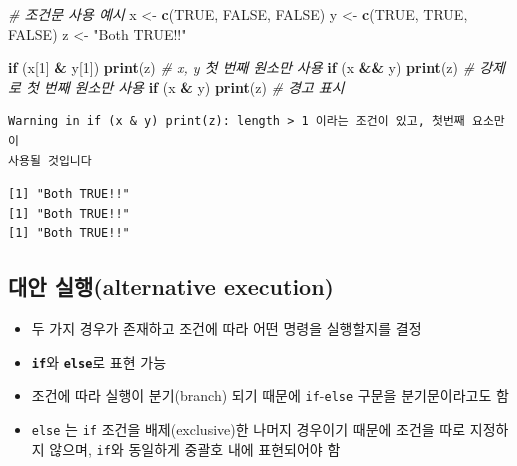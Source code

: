 \documentclass[
  11pt,
]{krantz}
\newenvironment{Shaded}{\begin{snugshade}}{\end{snugshade}}
\newcommand{\CommentTok}[1]{\textcolor[rgb]{0.37,0.37,0.37}{\textit{#1}}}
\newcommand{\ControlFlowTok}[1]{\textcolor[rgb]{0.27,0.27,0.27}{\textbf{#1}}}
\newcommand{\DecValTok}[1]{\textcolor[rgb]{0.06,0.06,0.06}{#1}}
\newcommand{\KeywordTok}[1]{\textcolor[rgb]{0.27,0.27,0.27}{\textbf{#1}}}
\newcommand{\NormalTok}[1]{#1}
\newcommand{\OperatorTok}[1]{\textcolor[rgb]{0.43,0.43,0.43}{\textbf{#1}}}
\newcommand{\OtherTok}[1]{\textcolor[rgb]{0.37,0.37,0.37}{#1}}
\newcommand{\StringTok}[1]{\textcolor[rgb]{0.5,0.5,0.5}{#1}}
\providecommand{\tightlist}{%
  \setlength{\itemsep}{0pt}\setlength{\parskip}{0pt}}
\begin{document}
\begin{Shaded}
\begin{Highlighting}[]
\CommentTok{# 조건문 사용 예시}
\NormalTok{x <-}\StringTok{ }\KeywordTok{c}\NormalTok{(}\OtherTok{TRUE}\NormalTok{, }\OtherTok{FALSE}\NormalTok{, }\OtherTok{FALSE}\NormalTok{)}
\NormalTok{y <-}\StringTok{ }\KeywordTok{c}\NormalTok{(}\OtherTok{TRUE}\NormalTok{, }\OtherTok{TRUE}\NormalTok{, }\OtherTok{FALSE}\NormalTok{)}
\NormalTok{z <-}\StringTok{ "Both TRUE!!"}

\ControlFlowTok{if}\NormalTok{ (x[}\DecValTok{1}\NormalTok{] }\OperatorTok{&}\StringTok{ }\NormalTok{y[}\DecValTok{1}\NormalTok{]) }\KeywordTok{print}\NormalTok{(z) }\CommentTok{# x, y 첫 번째 원소만 사용}
\ControlFlowTok{if}\NormalTok{ (x }\OperatorTok{&&}\StringTok{ }\NormalTok{y) }\KeywordTok{print}\NormalTok{(z) }\CommentTok{# 강제로 첫 번째 원소만 사용}
\ControlFlowTok{if}\NormalTok{ (x }\OperatorTok{&}\StringTok{ }\NormalTok{y) }\KeywordTok{print}\NormalTok{(z) }\CommentTok{# 경고 표시}
\end{Highlighting}
\end{Shaded}

\begin{verbatim}
Warning in if (x & y) print(z): length > 1 이라는 조건이 있고, 첫번째 요소만이
사용될 것입니다
\end{verbatim}

\begin{verbatim}
[1] "Both TRUE!!"
[1] "Both TRUE!!"
[1] "Both TRUE!!"
\end{verbatim}

\normalsize

\hypertarget{if-else}{%
\subsection*{\texorpdfstring{\textbf{대안 실행(alternative execution)}}{대안 실행(alternative execution)}}\label{if-else}}


\begin{itemize}
\tightlist
\item
  두 가지 경우가 존재하고 조건에 따라 어떤 명령을 실행할지를 결정
\item
  \textbf{\texttt{if}}와 \textbf{\texttt{else}}로 표현 가능
\item
  조건에 따라 실행이 분기(branch) 되기 때문에 \texttt{if}-\texttt{else} 구문을 분기문이라고도 함
\item
  \texttt{else} 는 \texttt{if} 조건을 배제(exclusive)한 나머지 경우이기 때문에 조건을 따로 지정하지 않으며, \texttt{if}와 동일하게 중괄호 내에 표현되어야 함
\end{itemize}
\end{document}
